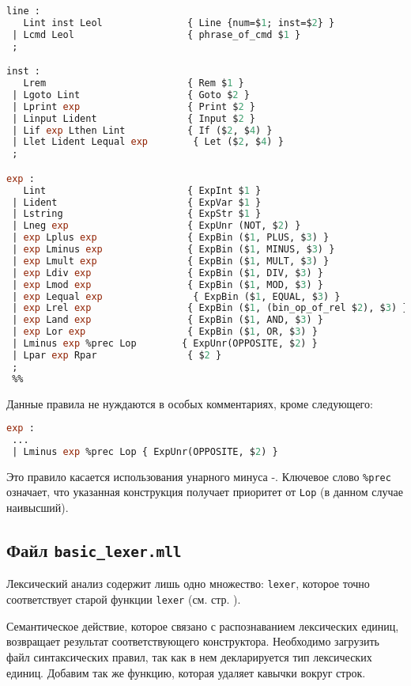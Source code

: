\begin{lstlisting}[language=Caml]
 %%
line :
   Lint inst Leol               { Line {num=$1; inst=$2} }
 | Lcmd Leol                    { phrase_of_cmd $1 }
 ;

inst :
   Lrem                         { Rem $1 }
 | Lgoto Lint                   { Goto $2 }
 | Lprint exp                   { Print $2 }
 | Linput Lident                { Input $2 }
 | Lif exp Lthen Lint           { If ($2, $4) }
 | Llet Lident Lequal exp        { Let ($2, $4) }
 ;

exp :
   Lint                         { ExpInt $1 }
 | Lident                       { ExpVar $1 }
 | Lstring                      { ExpStr $1 }
 | Lneg exp                     { ExpUnr (NOT, $2) }
 | exp Lplus exp                { ExpBin ($1, PLUS, $3) }
 | exp Lminus exp               { ExpBin ($1, MINUS, $3) }
 | exp Lmult exp                { ExpBin ($1, MULT, $3) }
 | exp Ldiv exp                 { ExpBin ($1, DIV, $3) }
 | exp Lmod exp                 { ExpBin ($1, MOD, $3) }
 | exp Lequal exp                { ExpBin ($1, EQUAL, $3) }
 | exp Lrel exp                 { ExpBin ($1, (bin_op_of_rel $2), $3) }
 | exp Land exp                 { ExpBin ($1, AND, $3) }
 | exp Lor exp                  { ExpBin ($1, OR, $3) }
 | Lminus exp %prec Lop        { ExpUnr(OPPOSITE, $2) }
 | Lpar exp Rpar                { $2 }
 ;
 %%
\end{lstlisting}

Данные правила не нуждаются в особых комментариях, кроме следующего:

\begin{lstlisting}[language=Caml]
exp :
 ...
 | Lminus exp %prec Lop { ExpUnr(OPPOSITE, $2) }
\end{lstlisting}

Это правило касается использования унарного минуса -. Ключевое слово
\texttt{\%prec} означает, что указанная конструкция получает приоритет от
\texttt{Lop} (в данном случае наивысший).

\subsection{Файл \texttt{basic\_lexer.mll}}

Лексический анализ содержит лишь одно множество: \texttt{lexer}, которое точно
соответствует старой функции \texttt{lexer} (см. стр. \pageref{??}).

Семантическое действие, которое связано с распознаванием лексических единиц,
возвращает результат соответствующего конструктора. Необходимо загрузить файл
синтаксических правил, так как в нем декларируется тип лексических единиц.
Добавим так же функцию, которая удаляет кавычки вокруг строк.

